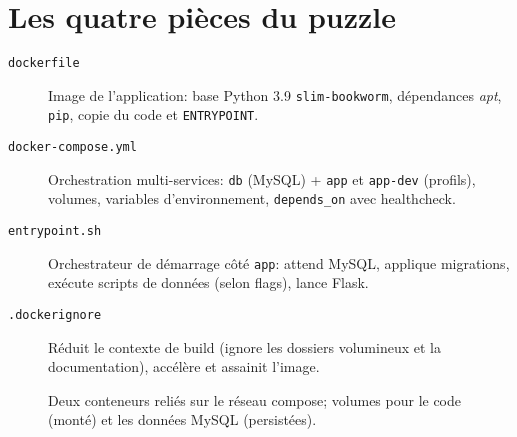 \section{Les quatre pièces du puzzle}

\begin{description}
  \item[\texttt{dockerfile}] Image de l'application: base Python 3.9 \texttt{slim-bookworm}, dépendances \textit{apt}, \texttt{pip}, copie du code et \texttt{ENTRYPOINT}.
  \item[\texttt{docker-compose.yml}] Orchestration multi-services: \texttt{db} (MySQL) + \texttt{app} et \texttt{app-dev} (profils), volumes, variables d'environnement, \texttt{depends\_on} avec healthcheck.
  \item[\texttt{entrypoint.sh}] Orchestrateur de démarrage côté \texttt{app}: attend MySQL, applique migrations, exécute scripts de données (selon flags), lance Flask.
  \item[\texttt{.dockerignore}] Réduit le contexte de build (ignore les dossiers volumineux et la documentation), accélère et assainit l'image.
\end{description}


\begin{figure}[H]
  \centering
  \caption{Deux conteneurs reliés sur le réseau compose; volumes pour le code (monté) et les données MySQL (persistées).}
\end{figure}

